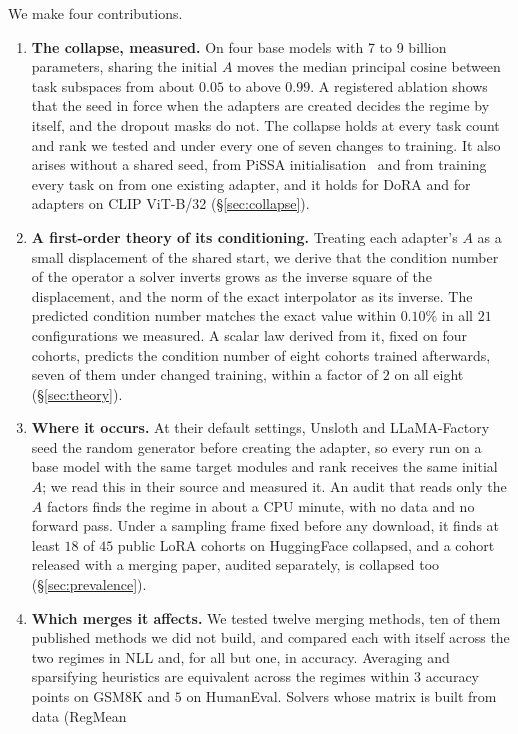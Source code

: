 We make four contributions.

\begin{enumerate}[leftmargin=*,itemsep=2pt,topsep=3pt]
\item \textbf{The collapse, measured.} On four base models with 7 to 9 billion
parameters, sharing the initial $A$ moves the median principal cosine between
task subspaces from about $0.05$ to above $0.99$. A registered ablation shows
that the seed in force when the adapters are created decides the regime by
itself, and the dropout masks do not. The collapse holds at every
task count and rank we tested and under every one of seven changes to
training. It also arises without a shared seed, from PiSSA
initialisation~\citep{meng2024pissa} and from training every task on from one
existing adapter, and it holds for DoRA and for adapters on CLIP ViT-B/32
(\S\ref{sec:collapse}).
\item \textbf{A first-order theory of its conditioning.} Treating each
adapter's $A$ as a small displacement of the shared start, we derive that the
condition number of the operator a solver inverts grows as the inverse square
of the displacement, and the norm of the exact interpolator as its inverse. The
predicted condition number matches the exact value within $0.10\%$ in all $21$
configurations we measured. A scalar law derived from it, fixed on four
cohorts, predicts the condition number of eight cohorts trained afterwards,
seven of them under changed training, within a factor of $2$ on all eight
(\S\ref{sec:theory}).
\item \textbf{Where it occurs.} At their default settings, Unsloth and
LLaMA-Factory seed the random generator before creating the adapter, so every
run on a base model with the same target modules and rank receives the same
initial $A$; we read this in their source and measured it. An audit that reads
only the $A$ factors finds the regime in about a CPU minute, with no data and
no forward pass. Under a sampling frame fixed before any download, it finds
at least $18$ of $45$ public LoRA cohorts on HuggingFace collapsed, and a
cohort released with a merging paper, audited separately, is collapsed too
(\S\ref{sec:prevalence}).
\item \textbf{Which merges it affects.} We tested twelve merging methods, ten
of them published methods we did not build, and compared each with itself
across the two regimes in NLL and, for all but one, in accuracy. Averaging and sparsifying
heuristics are equivalent across the regimes within $3$ accuracy points on
GSM8K and $5$ on HumanEval. Solvers whose matrix is built from data (RegMean

\end{enumerate}

